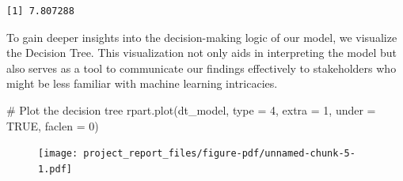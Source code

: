 \documentclass[
  super,
  preprint,
  3p]{elsarticle}
\newenvironment{Shaded}{\begin{snugshade}}{\end{snugshade}}
\newcommand{\AttributeTok}[1]{\textcolor[rgb]{0.40,0.45,0.13}{#1}}
\newcommand{\CommentTok}[1]{\textcolor[rgb]{0.37,0.37,0.37}{#1}}
\newcommand{\ConstantTok}[1]{\textcolor[rgb]{0.56,0.35,0.01}{#1}}
\newcommand{\DecValTok}[1]{\textcolor[rgb]{0.68,0.00,0.00}{#1}}
\newcommand{\FloatTok}[1]{\textcolor[rgb]{0.68,0.00,0.00}{#1}}
\newcommand{\FunctionTok}[1]{\textcolor[rgb]{0.28,0.35,0.67}{#1}}
\newcommand{\NormalTok}[1]{\textcolor[rgb]{0.00,0.23,0.31}{#1}}
\newcommand{\OtherTok}[1]{\textcolor[rgb]{0.00,0.23,0.31}{#1}}
\newcommand{\SpecialCharTok}[1]{\textcolor[rgb]{0.37,0.37,0.37}{#1}}
\newcommand{\StringTok}[1]{\textcolor[rgb]{0.13,0.47,0.30}{#1}}
\begin{document}
\begin{Shaded}
\end{Shaded}

\begin{verbatim}
[1] 7.807288
\end{verbatim}

To gain deeper insights into the decision-making logic of our model, we
visualize the Decision Tree. This visualization not only aids in
interpreting the model but also serves as a tool to communicate our
findings effectively to stakeholders who might be less familiar with
machine learning intricacies.

\begin{Shaded}
\begin{Highlighting}[]
\CommentTok{\# Plot the decision tree}
\FunctionTok{rpart.plot}\NormalTok{(dt\_model, }\AttributeTok{type =} \DecValTok{4}\NormalTok{, }\AttributeTok{extra =} \DecValTok{1}\NormalTok{, }\AttributeTok{under =} \ConstantTok{TRUE}\NormalTok{, }\AttributeTok{faclen =} \DecValTok{0}\NormalTok{)}
\end{Highlighting}
\end{Shaded}

\begin{figure}[H]

{\centering \texttt{[image: project\_report\_files/figure-pdf/unnamed-chunk-5-1.pdf]}

}

\end{figure}
\end{document}
